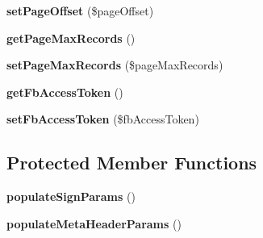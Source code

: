 \begin{DoxyCompactItemize}
\item 
\hypertarget{class_app42_service_aada5a45e3550504571e9ccf812df3f53}{{\bfseries set\+Page\+Offset} (\$page\+Offset)}\label{class_app42_service_aada5a45e3550504571e9ccf812df3f53}

\item 
\hypertarget{class_app42_service_a83616fa3ef25ffd6e1560b78794c4d1c}{{\bfseries get\+Page\+Max\+Records} ()}\label{class_app42_service_a83616fa3ef25ffd6e1560b78794c4d1c}

\item 
\hypertarget{class_app42_service_a6e96eb9ef74fa1b6fc028edc219f7dce}{{\bfseries set\+Page\+Max\+Records} (\$page\+Max\+Records)}\label{class_app42_service_a6e96eb9ef74fa1b6fc028edc219f7dce}

\item 
\hypertarget{class_app42_service_a923155f9b5794ca72f92fc57f4988f0e}{{\bfseries get\+Fb\+Access\+Token} ()}\label{class_app42_service_a923155f9b5794ca72f92fc57f4988f0e}

\item 
\hypertarget{class_app42_service_a5ae76f8f7f37c435fae97133cb6fdd76}{{\bfseries set\+Fb\+Access\+Token} (\$fb\+Access\+Token)}\label{class_app42_service_a5ae76f8f7f37c435fae97133cb6fdd76}

\end{DoxyCompactItemize}
\subsection*{Protected Member Functions}
\begin{DoxyCompactItemize}
\item 
\hypertarget{class_app42_service_a347ab67b2c6381093b98b022c5c661ab}{{\bfseries populate\+Sign\+Params} ()}\label{class_app42_service_a347ab67b2c6381093b98b022c5c661ab}

\item 
\hypertarget{class_app42_service_af745c356016c20d9d05972d812abd395}{{\bfseries populate\+Meta\+Header\+Params} ()}\label{class_app42_service_af745c356016c20d9d05972d812abd395}

\end{DoxyCompactItemize}
